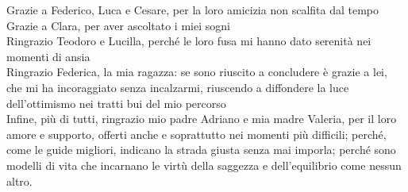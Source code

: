 \begin{acknowledgements}
Grazie a Federico, Luca e Cesare, per la loro amicizia non scalfita dal tempo\\
Grazie a Clara, per aver ascoltato i miei sogni\\
Ringrazio Teodoro e Lucilla, perché le loro fusa mi hanno dato serenità nei momenti di ansia\\
Ringrazio Federica, la mia ragazza: se sono riuscito a concludere è grazie a lei, che mi ha incoraggiato senza incalzarmi, riuscendo a diffondere la luce dell’ottimismo nei tratti bui del mio percorso\\
Infine, più di tutti, ringrazio mio padre Adriano e mia madre Valeria, per il loro amore e supporto, offerti anche e soprattutto nei momenti più difficili; perché, come le guide migliori, indicano la strada giusta senza mai imporla; perché sono modelli di vita che incarnano le virtù della saggezza e dell’equilibrio come nessun altro.

\end{acknowledgements}
